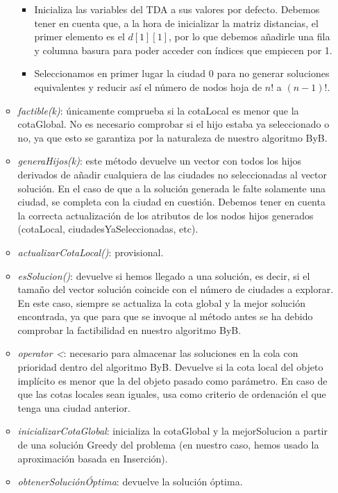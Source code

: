 \documentclass{article}
\begin{document}
\begin{itemize}
\begin{itemize}
			\begin{itemize}
				\item Inicializa las variables del TDA a sus valores por defecto. Debemos tener en cuenta que, a la hora de inicializar la matriz distancias, el primer elemento es el $d[1][1]$, por lo que debemos añadirle una fila y columna basura para poder acceder con índices que empiecen por 1.
				\item Seleccionamos en primer lugar la ciudad 0 para no generar soluciones equivalentes y reducir así el número de nodos hoja de $n!$ a $(n-1)!$.
			\end{itemize}
			\item \textit {factible(k)}: únicamente comprueba si la cotaLocal es menor que la cotaGlobal. No es necesario comprobar si el hijo estaba ya seleccionado o no, ya que esto se garantiza por la naturaleza de nuestro algoritmo ByB.
			\item \textit {generaHijos(k)}: este método devuelve un vector con todos los hijos derivados de añadir cualquiera de las ciudades no seleccionadas al vector solución. En el caso de que a la solución generada le falte solamente una ciudad, se completa con la ciudad en cuestión. Debemos tener en cuenta la correcta actualización de los atributos de los nodos hijos generados (cotaLocal, ciudadesYaSeleccionadas, etc).
			\item \textit{actualizarCotaLocal()}: provisional.
			\item \textit{esSolucion()}: devuelve si hemos llegado a una solución, es decir, si el tamaño del vector solución coincide con el número de ciudades a explorar. En este caso, siempre se actualiza la cota global y la mejor solución encontrada, ya que para que se invoque al método antes se ha debido comprobar la factibilidad en nuestro algoritmo ByB.
			\item \textit{operator <}: necesario para almacenar las soluciones en la cola con prioridad dentro del algoritmo ByB. Devuelve si la cota local del objeto implícito es menor que la del objeto pasado como parámetro. En caso de que las cotas locales sean iguales, usa como criterio de ordenación el que tenga una ciudad anterior.
			\item \textit{inicializarCotaGlobal}: inicializa la cotaGlobal y la mejorSolucion a partir de una solución Greedy del problema (en nuestro caso, hemos usado la aproximación basada en Inserción).
			\item \textit{obtenerSoluciónÓptima}: devuelve la solución óptima.
		\end{itemize}
	\end{itemize}
\end{document}
